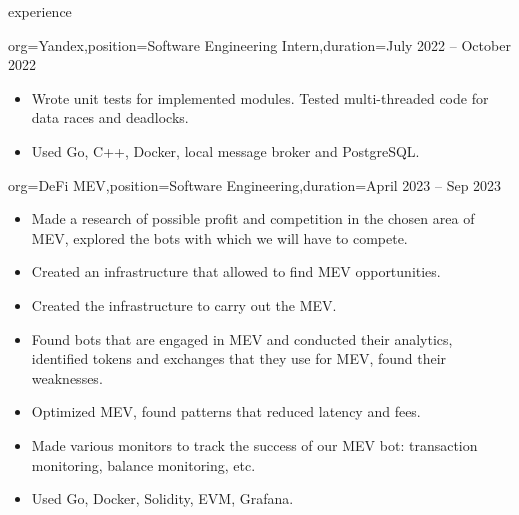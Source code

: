 \documentclass{resume}
\begin{document}
\begin{ResumeSection}{experience}
\begin{ResumeSubsection}{org=Yandex,position={Software Engineering Intern},duration=July 2022 – October 2022}
\begin{itemize}
            \item {
                Wrote unit tests for implemented modules. Tested multi-threaded code for data races and deadlocks.
            }

            \item {
                Used Go, C++, Docker, local message broker and PostgreSQL.
            }
        \end{itemize}
    \end{ResumeSubsection}

    \begin{ResumeSubsection}{org=DeFi MEV,position={Software Engineering},duration=April 2023 – Sep 2023}
        \begin{itemize}
            \item {
                Made a research of possible profit and competition in the chosen area of MEV, explored the bots with which we will have to compete.
            }

            \item {
                Created an infrastructure that allowed to find MEV opportunities.
            }

            \item {
                Created the infrastructure to carry out the MEV.
            }

            \item {
                Found bots that are engaged in MEV and conducted their analytics, identified tokens and exchanges that they use for MEV, found their weaknesses.
            }

            \item {
                Optimized MEV, found patterns that reduced latency and fees.
            }

            \item {
                Made various monitors to track the success of our MEV bot: transaction monitoring, balance monitoring, etc.
            }

            \item {
                Used Go, Docker, Solidity, EVM, Grafana.
            }
        \end{itemize}
    \end{ResumeSubsection}
\end{ResumeSection}
\end{document}
